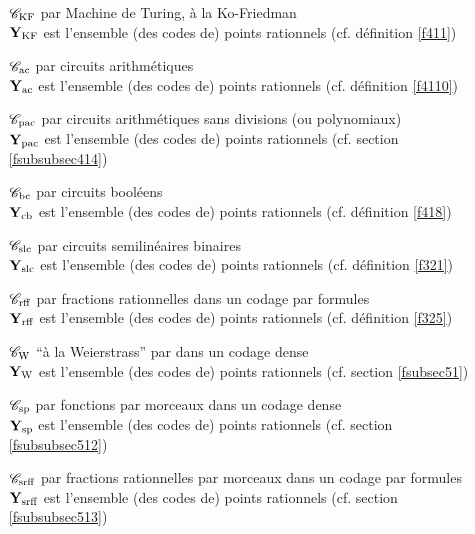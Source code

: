 \begin{itemize}\itemsep2pt
\item[${{{\mathscr C}}_{\rm KF}}$] \pres par Machine de Turing, à la Ko-Friedman\\
${{\bf Y}_{\rm KF}}$ est l'ensemble (des codes de) points rationnels (cf. définition \ref{f411})
%
\item[${{{\mathscr C}}_{\rm ac}}$] \pres par circuits arithmétiques\\
${{\bf Y}_{\rm ac}}$ est l'ensemble (des codes de) points rationnels (cf. définition \ref{f4110})
%
\item[${{{\mathscr C}}_{\rm pac}}$] \pres par circuits arithmétiques sans divisions (ou polynomiaux)\\
${{\bf Y}_{\rm pac}}$ est l'ensemble (des codes de) points rationnels (cf. section \ref{fsubsubsec414})
% 
\item[${{{\mathscr C}}_{\rm bc}}$] \pres par circuits booléens\\
${{\bf Y}_{\rm cb}}$ est l'ensemble (des codes de) points rationnels  (cf. définition \ref{f418})
%
\item[${{{\mathscr C}}_{\rm slc}}$] \pres par circuits semilinéaires binaires\\
${{\bf Y}_{\rm slc}}$ est l'ensemble (des codes de) points rationnels (cf. définition 
\ref{f321})
%
\item[${{{\mathscr C}}_{\rm rff}}$] \pres par fractions rationnelles dans un codage par formules\\
${{\bf Y}_{\rm rff}}$ est l'ensemble (des codes de) points rationnels (cf. 
définition \ref{f325})
%
\item[${{{\mathscr C}}_{\rm W}}$]  \pres ``à la Weierstrass'' par \pols dans un codage dense\\
${{\bf Y}_{\rm W}}$ est l'ensemble (des codes de) points rationnels (cf. 
section \ref{fsubsec51})
%
\item[${{{\mathscr C}}_{\rm sp}}$] \pres par fonctions \polles par morceaux dans un codage dense\\
${{\bf Y}_{\rm sp}}$ est l'ensemble (des codes de) points rationnels (cf. section \ref{fsubsubsec512})
%
\item[${{{\mathscr C}}_{\rm srff}}$] \pres par fractions rationnelles par morceaux dans un codage par formules\\
${{\bf Y}_{\rm srff}}$ est l'ensemble (des codes de) points rationnels (cf. section \ref{fsubsubsec513})
\end{itemize}

